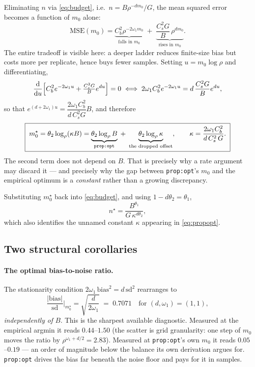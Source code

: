 \documentclass[11pt]{article}
\newcommand{\sd}{\mathrm{sd}}
\newcommand{\MSE}{\mathrm{MSE}}
\begin{document}
Eliminating $n$ via \eqref{eq:budget}, i.e.\ $n=B\rho^{-dm_0}/G$, the mean
squared error becomes a function of $m_0$ alone:
\begin{equation}
  \MSE(m_0)=\underbrace{C_b^2\rho^{-2\omega_1 m_0}}_{\text{falls in }m_0}
  \;+\;\underbrace{\frac{C_s^2G}{B}\,\rho^{dm_0}}_{\text{rises in }m_0}.
  \label{eq:mse}
\end{equation}
The entire tradeoff is visible here: a deeper ladder reduces finite-size bias
but costs more per replicate, hence buys fewer samples. Setting
$u=m_0\log\rho$ and differentiating,
\begin{equation}
  \frac{\mathrm d}{\mathrm du}\Bigl[C_b^2e^{-2\omega_1u}
  +\tfrac{C_s^2G}{B}e^{du}\Bigr]=0
  \;\Longleftrightarrow\;
  2\omega_1C_b^2e^{-2\omega_1u}=d\,\frac{C_s^2G}{B}e^{du},
\end{equation}
so that $e^{(d+2\omega_1)u}=\dfrac{2\omega_1C_b^2}{d\,C_s^2G}B$, and therefore
\begin{equation}
  \boxed{\;
  m_0^{\star}=\theta_2\log_\rho(\kappa B)
  =\underbrace{\theta_2\log_\rho B}_{\text{\texttt{prop:opt}}}
  \;+\;\underbrace{\theta_2\log_\rho\kappa}_{\text{the dropped offset}},
  \qquad
  \kappa=\frac{2\omega_1C_b^2}{d\,C_s^2\,G}.
  \;}
  \label{eq:kappa}
\end{equation}
The second term does not depend on $B$. That is precisely why a rate argument
may discard it --- and precisely why the gap between \texttt{prop:opt}'s $m_0$
and the empirical optimum is a \emph{constant} rather than a growing
discrepancy.

Substituting $m_0^\star$ back into \eqref{eq:budget}, and using
$1-d\theta_2=\theta_1$,
\begin{equation}
  n^{\star}=\frac{B^{\theta_1}}{G\,\kappa^{d\theta_2}},
\end{equation}
which also identifies the unnamed constant $\kappa$ appearing in
\eqref{eq:propopt}.

\subsection{Two structural corollaries}

\paragraph{The optimal bias-to-noise ratio.}
The stationarity condition $2\omega_1\,\text{bias}^2=d\,\sd^2$ rearranges to
\begin{equation}
  \frac{\lvert\text{bias}\rvert}{\sd}\Big|_{m_0^\star}=\sqrt{\frac{d}{2\omega_1}}
  \;=\;0.7071 \quad\text{for }(d,\omega_1)=(1,1),
  \label{eq:ratio}
\end{equation}
\emph{independently of $B$}. This is the sharpest available diagnostic. Measured
at the empirical argmin it reads $0.44$--$1.50$ (the scatter is grid
granularity: one step of $m_0$ moves the ratio by $\rho^{\omega_1+d/2}=2.83$).
Measured at \texttt{prop:opt}'s own $m_0$ it reads $0.05$--$0.19$ --- an order
of magnitude below the balance its own derivation argues for. \texttt{prop:opt}
drives the bias far beneath the noise floor and pays for it in samples.
\end{document}
